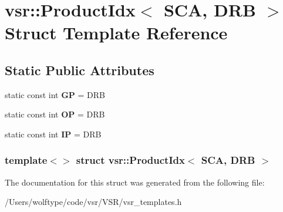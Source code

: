\hypertarget{structvsr_1_1_product_idx_3_01_s_c_a_00_01_d_r_b_01_4}{\section{vsr\-:\-:Product\-Idx$<$ S\-C\-A, D\-R\-B $>$ Struct Template Reference}
\label{structvsr_1_1_product_idx_3_01_s_c_a_00_01_d_r_b_01_4}
}
\subsection*{Static Public Attributes}
\begin{DoxyCompactItemize}
\item 
\hypertarget{structvsr_1_1_product_idx_3_01_s_c_a_00_01_d_r_b_01_4_a7a186dad78782105678417b29dc6e6a5}{static const int {\bfseries G\-P} = D\-R\-B}\label{structvsr_1_1_product_idx_3_01_s_c_a_00_01_d_r_b_01_4_a7a186dad78782105678417b29dc6e6a5}

\item 
\hypertarget{structvsr_1_1_product_idx_3_01_s_c_a_00_01_d_r_b_01_4_a635950a459b345422cf61852fce4d0d4}{static const int {\bfseries O\-P} = D\-R\-B}\label{structvsr_1_1_product_idx_3_01_s_c_a_00_01_d_r_b_01_4_a635950a459b345422cf61852fce4d0d4}

\item 
\hypertarget{structvsr_1_1_product_idx_3_01_s_c_a_00_01_d_r_b_01_4_a08887d5ada1e11090c0a4a1d6a5b9f22}{static const int {\bfseries I\-P} = D\-R\-B}\label{structvsr_1_1_product_idx_3_01_s_c_a_00_01_d_r_b_01_4_a08887d5ada1e11090c0a4a1d6a5b9f22}

\end{DoxyCompactItemize}
\subsubsection*{template$<$$>$ struct vsr\-::\-Product\-Idx$<$ S\-C\-A, D\-R\-B $>$}



The documentation for this struct was generated from the following file\-:\begin{DoxyCompactItemize}
\item 
/\-Users/wolftype/code/vsr/\-V\-S\-R/vsr\-\_\-templates.\-h\end{DoxyCompactItemize}
